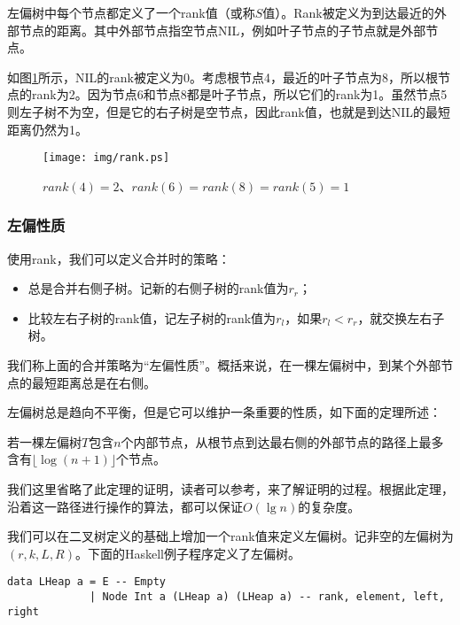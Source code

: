 \documentclass[UTF8]{article}
\begin{document}
左偏树中每个节点都定义了一个rank值（或称$S$值）。Rank被定义为到达最近的外部节点的距离。其中外部节点指空节点NIL，例如叶子节点的子节点就是外部节点。

如图\ref{fig:rank}所示，NIL的rank被定义为0。考虑根节点4，最近的叶子节点为8，所以根节点的rank为2。因为节点6和节点8都是叶子节点，所以它们的rank为1。虽然节点5则左子树不为空，但是它的右子树是空节点，因此rank值，也就是到达NIL的最短距离仍然为1。

\begin{figure}[htbp]
   \begin{center}
     \texttt{[image: img/rank.ps]}
     \caption{$rank(4) = 2$、$rank(6) = rank(8) = rank(5) = 1$} \label{fig:rank}
   \end{center}
\end{figure}

\subsubsection{左偏性质}

使用rank，我们可以定义合并时的策略：

\begin{itemize}
\item 总是合并右侧子树。记新的右侧子树的rank值为$r_r$；
\item 比较左右子树的rank值，记左子树的rank值为$r_l$，如果$r_l < r_r$，就交换左右子树。
\end{itemize}

我们称上面的合并策略为“左偏性质”。概括来说，在一棵左偏树中，到某个外部节点的最短距离总是在右侧。

左偏树总是趋向不平衡，但是它可以维护一条重要的性质，如下面的定理所述：

\begin{theorem}
若一棵左偏树$T$包含$n$个内部节点，从根节点到达最右侧的外部节点的路径上最多含有$\lfloor \log (n+1) \rfloor$个节点。
\end{theorem}

我们这里省略了此定理的证明，读者可以参考\cite{brono-book}，\cite{TAOCP-bheap}来了解证明的过程。根据此定理，沿着这一路径进行操作的算法，都可以保证$O(\lg n)$的复杂度。

我们可以在二叉树定义的基础上增加一个rank值来定义左偏树。记非空的左偏树为$(r, k, L, R)$。下面的Haskell例子程序定义了左偏树。

\lstset{language=Haskell}
\begin{lstlisting}
data LHeap a = E -- Empty
             | Node Int a (LHeap a) (LHeap a) -- rank, element, left, right
\end{lstlisting}
\end{document}
